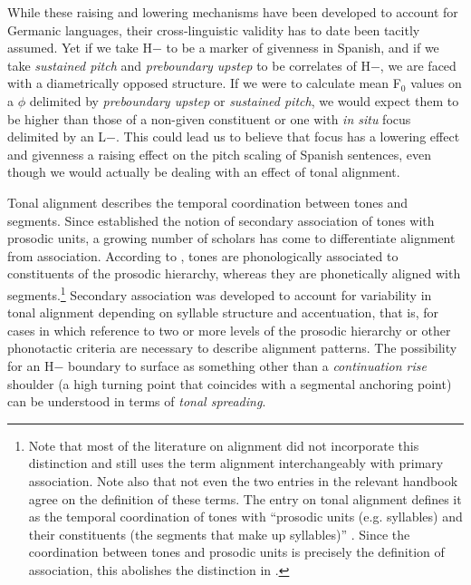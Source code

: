 While these raising and lowering mechanisms have been developed to account 
for Germanic languages, their cross-linguistic validity has to date been 
tacitly assumed. Yet if we take H$-$ to be a marker of givenness in 
Spanish,
and if we take \textit{sustained pitch} and \textit{preboundary upstep} to be correlates of H$-$, we are 
faced with a diametrically opposed structure. If we were to calculate mean 
F$_0$ values on a $\phi$ delimited by \textit{preboundary upstep} or \textit{sustained pitch}, we would expect 
them to be higher than those of a non-given constituent or one with 
\textit{in situ} focus delimited by an L$-$. This could lead us to believe 
that focus has a lowering effect and givenness a raising effect on the 
pitch scaling of Spanish sentences, even though we would actually be 
dealing with an effect of tonal alignment.

Tonal alignment describes the temporal coordination between tones and 
segments. Since \citet{PierrehumbertBeckman.1988} established the notion 
of secondary association of tones with prosodic units, a growing number of scholars has come to differentiate alignment from association. According to \citet[266]{Arvaniti.2012}, tones are phonologically associated to constituents of the prosodic hierarchy, whereas they are phonetically aligned with segments.\footnote{Note that most of the literature on alignment did not incorporate this distinction and still uses the term alignment interchangeably with primary association. Note also that not even the two entries in the relevant handbook agree on the definition of these terms. The entry on tonal alignment defines it as the temporal coordination 
of tones with ``prosodic units (e.g. syllables) and their constituents 
(the segments that make up syllables)'' \citep[275]{DImperio.2012}. Since the coordination between tones and prosodic units is precisely the definition of association, this abolishes the distinction in \citet{Arvaniti.2012}.} Secondary association was developed to account for variability in tonal alignment depending on 
syllable structure and accentuation, that is, for cases in which reference to two or more levels of the prosodic hierarchy or other phonotactic criteria are necessary to 
describe alignment patterns. The possibility for an H$-$ boundary to surface as something other than a \textit{continuation rise} shoulder (a high turning point that coincides with a segmental anchoring point) can be understood in terms of \textit{tonal spreading}.\largerpage


